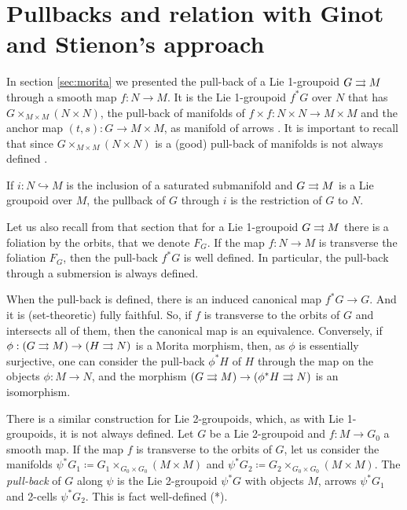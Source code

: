 %
%

\section{Pullbacks and relation with Ginot and Stienon's approach}


In section \ref{sec:morita} we presented the pull-back of a Lie 1-groupoid $G\rightrightarrows M$ through a smooth map $f: N\to M$.
It is the Lie 1-groupoid $f^*G$ over $N$ that has $G\times_{M\times M} (N\times N)$, the pull-back of manifolds of $f\times f: N\times N\to M\times M$ and the anchor map $(t,s): G\to M\times M$, as manifold of arrows \cite{dh13, mm03}.
It is important to recall that since $G\times_{M\times M} (N\times N)$ is a (good) pull-back of manifolds is not always defined \cite{dh13}.

\begin{example}
If $i: N\hookrightarrow M$ is the inclusion of a saturated submanifold and $G\rightrightarrows M$ is a Lie groupoid over $M$, the pullback of $G$ through $i$ is the restriction of $G$ to $N$.
\end{example}

Let us also recall from that section that for a Lie 1-groupoid $G\rightrightarrows M$ there is a foliation by the orbits, that we denote $F_G$.
If the map $f: N\to M$ is transverse the foliation $F_G$, then the pull-back $f^*G$ is well defined.
In particular, the pull-back through a submersion is always defined.

When the pull-back is defined, there is an induced canonical map $f^*G\to G$.
And it is (set-theoretic) fully faithful.
So, if $f$ is transverse to the orbits of $G$ and intersects all of them, then the canonical map is an equivalence.
Conversely, if $\phi: (G\rightrightarrows M)\to (H\rightrightarrows N)$ is a Morita morphism, then, as $\phi$ is essentially surjective, one can consider the pull-back $\phi^*H$ of $H$ through the map on the objects $\phi: M\to N$, and the morphism $(G\rightrightarrows M)\to (\phi^*H\rightrightarrows N)$ is an isomorphism.

There is a similar construction for Lie 2-groupoids, which, as with Lie 1-groupoids, it is not always defined.
Let $G$ be a Lie 2-groupoid and $f: M\to G_0$ a smooth map.
If the map $f$ is transverse to the orbits of $G$, let us consider the manifolds $\psi^*G_1 \coloneqq G_1\times_{G_0\times G_0}(M\times M)$ and $\psi^*G_2 \coloneqq G_2\times_{G_0\times G_0}(M\times M)$.
The \emph{pull-back} of $G$ along $\psi$ is the Lie 2-groupoid $\psi^*G$ with objects $M$, arrows $\psi^*G_1$ and 2-cells $\psi^*G_2$.
This is fact well-defined (*).

